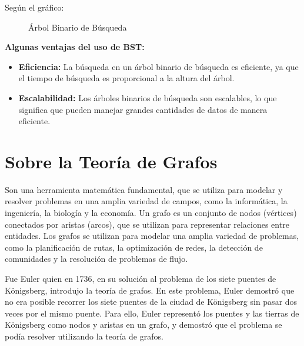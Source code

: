\documentclass[11pt, a4paper]{article}
\begin{document}
  Según el gráfico:

  \begin{figure}[H]
    \centering
    \caption{Árbol Binario de Búsqueda}
    \label{fig:arbol-binario}
  \end{figure}


  \textbf{Algunas ventajas del uso de BST:}

  \begin{itemize}
    \item \textbf{Eficiencia:} La búsqueda en un árbol binario de búsqueda es eficiente, ya que el tiempo de búsqueda es proporcional a la altura del árbol.
    \item \textbf{Escalabilidad:} Los árboles binarios de búsqueda son escalables, lo que significa que pueden manejar grandes cantidades de datos de manera eficiente.
  \end{itemize}

\newpage

\section{Sobre la Teoría de Grafos}

  Son una herramienta matemática fundamental, que se utiliza para modelar y resolver problemas en una amplia variedad de campos, como la informática, la ingeniería, la biología y la economía. Un grafo es un conjunto de nodos (vértices) conectados por aristas (arcos), que se utilizan para representar relaciones entre entidades. Los grafos se utilizan para modelar una amplia variedad de problemas, como la planificación de rutas, la optimización de redes, la detección de comunidades y la resolución de problemas de flujo.

  Fue Euler quien en 1736, en su solución al problema de los siete puentes de Königsberg, introdujo la teoría de grafos. En este problema, Euler demostró que no era posible recorrer los siete puentes de la ciudad de Königsberg sin pasar dos veces por el mismo puente. Para ello, Euler representó los puentes y las tierras de Königsberg como nodos y aristas en un grafo, y demostró que el problema se podía resolver utilizando la teoría de grafos.
\end{document}
